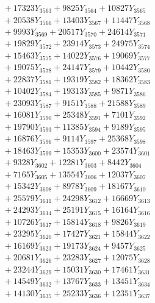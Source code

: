 \documentclass[a4paper,10pt]{article}
\begin{document}
{\begin{align}
&\;  + 17323 Y_{3563} + 9825 Y_{3564} + 10827 Y_{3565} \\[0.3ex]
&\;  + 20538 Y_{3566} + 13403 Y_{3567} + 11447 Y_{3568} \\[0.5ex]\allowbreak
&\;  + 9993 Y_{3569} + 20517 Y_{3570} + 24614 Y_{3571} \\[0.3ex]
&\;  + 19829 Y_{3572} + 23914 Y_{3573} + 24975 Y_{3574} \\[0.3ex]
&\;  + 15463 Y_{3575} + 14022 Y_{3576} + 19069 Y_{3577} \\[0.3ex]
&\;  + 19075 Y_{3578} + 24147 Y_{3579} + 10442 Y_{3580} \\[0.3ex]
&\;  + 22837 Y_{3581} + 19319 Y_{3582} + 18362 Y_{3583} \\[0.3ex]
&\;  + 10402 Y_{3584} + 19313 Y_{3585} + 9871 Y_{3586} \\[0.3ex]
&\;  + 23093 Y_{3587} + 9151 Y_{3588} + 21588 Y_{3589} \\[0.3ex]
&\;  + 16081 Y_{3590} + 25348 Y_{3591} + 7101 Y_{3592} \\[0.3ex]
&\;  + 19790 Y_{3593} + 11385 Y_{3594} + 9189 Y_{3595} \\[0.3ex]
&\;  + 16876 Y_{3596} + 9114 Y_{3597} + 25368 Y_{3598} \\[0.5ex]\allowbreak
&\;  + 18463 Y_{3599} + 15353 Y_{3600} + 23574 Y_{3601} \\[0.3ex]
&\;  + 9328 Y_{3602} + 12281 Y_{3603} + 8442 Y_{3604} \\[0.3ex]
&\;  + 7165 Y_{3605} + 13554 Y_{3606} + 12037 Y_{3607} \\[0.3ex]
&\;  + 15342 Y_{3608} + 8978 Y_{3609} + 18167 Y_{3610} \\[0.3ex]
&\;  + 25579 Y_{3611} + 24298 Y_{3612} + 16669 Y_{3613} \\[0.3ex]
&\;  + 24293 Y_{3614} + 25191 Y_{3615} + 16164 Y_{3616} \\[0.3ex]
&\;  + 10726 Y_{3617} + 15814 Y_{3618} + 9826 Y_{3619} \\[0.3ex]
&\;  + 23295 Y_{3620} + 17427 Y_{3621} + 15844 Y_{3622} \\[0.3ex]
&\;  + 16169 Y_{3623} + 19173 Y_{3624} + 9457 Y_{3625} \\[0.3ex]
&\;  + 20681 Y_{3626} + 23283 Y_{3627} + 12075 Y_{3628} \\[0.5ex]\allowbreak
&\;  + 23244 Y_{3629} + 15031 Y_{3630} + 17461 Y_{3631} \\[0.3ex]
&\;  + 14549 Y_{3632} + 13767 Y_{3633} + 13451 Y_{3634} \\[0.3ex]
&\;  + 14130 Y_{3635} + 25233 Y_{3636} + 12351 Y_{3637} \\[0.3ex]

\end{align}}
\end{document}
